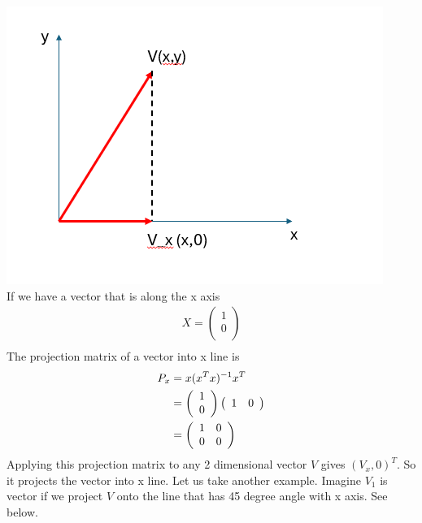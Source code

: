 \documentclass[a4paper]{article}
\begin{document}
\includegraphics[scale = 1]{project1.png}\\
If we have a vector that is along the x axis
\begin{align*}
X = \left( \begin{array} {c }
              1  \\
              0  \\
            \end{array} \right)\\
\end{align*}
 The projection matrix of a vector into x line is 
\begin{align*}
P_x & = x(x^Tx)^{-1}x^T \\
     & = \left( \begin{array} {c}
              1 \\
              0 \\
            \end{array} \right)
 \left( \begin{array} { c  c } 
                   1 & 0\\
           \end{array} \right) \\
       & =  \left( \begin{array} { c  c } 
                   1 & 0  \\
                   0 & 0  \\
           \end{array} \right)
\end{align*}
Applying this projection matrix to any 2 dimensional vector $V$ gives $(V_x, 0)^T$. So it projects the vector into x line. 
Let us take another example. Imagine $V_1$ is vector if we project $V$ onto the line that has 45 degree angle with x axis. See below.
\end{document}
